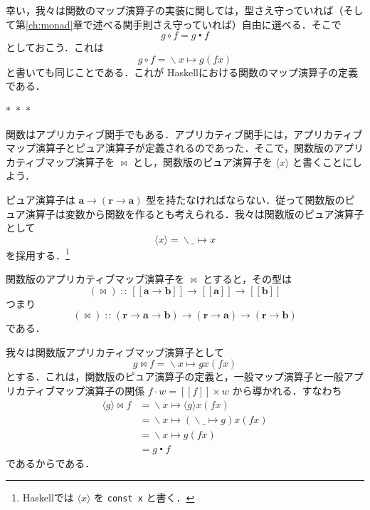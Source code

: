 \documentclass[a5paper,twoside,fleqn,draft]{jsbook}
\def\[{[\![}
\def\]{]\!]}
\newcommand{\separator}{\begin{center}$*$~$*$~$*$\end{center}}
\newcommand{\programminglanguage}[1]{\textsf{#1}}
\newcommand{\haskell}{\programminglanguage{Haskell}}
\newcommand{\code}[1]{\texttt{#1}}
\DeclareMathOperator{\mAppMap}{\times}
\DeclareMathOperator{\mAppMapFunc}{\bowtie}
\DeclareMathOperator{\mCompFunc}{\centerdot}
\DeclareMathOperator{\mFuncArrow}{\rightarrow}
\DeclareMathOperator{\mIn}{{:\!:}}
\DeclareMathOperator{\mLambda}{\backslash}
\DeclareMathOperator{\mLambdaArrow}{\mapsto}
\DeclareMathOperator{\mMap}{\cdot}
\DeclareMathOperator{\mMapFunc}{\circ}
\newcommand{\mType}[1]{\mathbf{#1}} %
\newcommand{\mA}{\mType{a}}
\newcommand{\mB}{\mType{b}}
\newcommand{\mR}{\mType{r}}
\newcommand{\mTypeAssemble}[2]{{}^\mathrm{#1}\[\mType{#2}\]}
\DeclareMathOperator{\mFuncTypeConstructor}{((\rightarrow)\mType{r})}
\newcommand{\mFuncType}[1]{\mTypeAssemble{\mFuncTypeConstructor}{#1}}
\newcommand{\mConstWith}[1]{\langle#1\rangle}
\newcommand{\mPureWith}[1]{\[#1\]}
\newcommand{\mLambdaEXP}[2]{\mLambda{#1}\mLambdaArrow{#2}} %
\newcommand{\mProjEXP}[2]{#1\mFuncArrow#2} %
\begin{document}
幸い，我々は関数のマップ演算子の実装に関しては，型さえ守っていれば（そして第\ref{ch:monad}章で述べる関手則さえ守っていれば）自由に選べる．そこで
\begin{equation}
  g\mMapFunc f
  =g\mCompFunc f
\end{equation}
としておこう．これは
\begin{equation}
  g\mMapFunc f
  =\mLambdaEXP{x}{g(fx)}
\end{equation}
と書いても同じことである．これが \haskell における関数のマップ演算子の定義である．

\separator

関数はアプリカティブ関手でもある．アプリカティブ関手には，アプリカティブマップ演算子とピュア演算子が定義されるのであった．そこで，関数版のアプリカティブマップ演算子を $\mAppMapFunc$ とし，関数版のピュア演算子を $\mConstWith{x}$ と書くことにしよう．

ピュア演算子は $\mProjEXP{\mA }{(\mProjEXP{\mR}{\mA })}$ 型を持たなければならない．従って関数版のピュア演算子は変数から関数を作るとも考えられる．我々は関数版のピュア演算子として
\begin{equation}
  \mConstWith{x}
  =\mLambdaEXP{\_}{x}
\end{equation}
を採用する．\footnote{\haskell では $\mConstWith{x}$ を \code{const x} と書く．}

関数版のアプリカティブマップ演算子を $\mAppMapFunc$ とすると，その型は
\begin{equation}
  (\mAppMapFunc)
  \mIn\mFuncType{\mA\mFuncArrow\mB}
  \mFuncArrow\mFuncType{\mA}
  \mFuncArrow\mFuncType{\mB}
\end{equation}
つまり
\begin{equation}
  (\mAppMapFunc)
  \mIn{}(\mR\mFuncArrow\mA\mFuncArrow\mB)
  \mFuncArrow(\mR\mFuncArrow\mA)
  \mFuncArrow(\mR\mFuncArrow\mB)
\end{equation}
である．

我々は関数版アプリカティブマップ演算子として
\begin{equation}
g\mAppMapFunc f=\mLambdaEXP{x}{gx(fx)}
\end{equation}
とする．これは，関数版のピュア演算子の定義と，一般マップ演算子と一般アプリカティブマップ演算子の関係 $f\mMap w=\mPureWith{f}\mAppMap w$ から導かれる．すなわち
\begin{align}
\mConstWith{g}\mAppMapFunc f
&=\mLambdaEXP{x}{\mConstWith{g}x(fx)}\\
&=\mLambdaEXP{x}{(\mLambdaEXP{\_}{g})x(fx)}\\
&=\mLambdaEXP{x}{g(fx)}\\
&=g\mCompFunc f
\end{align}
であるからである．
\end{document}
